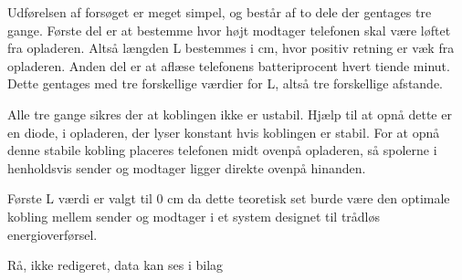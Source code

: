 Udførelsen af forsøget er meget simpel, og består af to dele der gentages tre gange. Første del er at bestemme hvor højt modtager telefonen skal være løftet fra opladeren. Altså længden L bestemmes i cm, hvor positiv retning er væk fra opladeren. Anden del er at aflæse telefonens batteriprocent hvert tiende minut. Dette gentages med tre forskellige værdier for L, altså tre forskellige afstande.

Alle tre gange sikres der at koblingen ikke er ustabil. Hjælp til at opnå dette er en diode, i opladeren, der lyser konstant hvis koblingen er stabil. For at opnå denne stabile kobling placeres telefonen midt ovenpå opladeren, så spolerne i henholdsvis sender og modtager ligger direkte ovenpå hinanden.

Første L værdi er valgt til 0 cm da dette teoretisk set burde være den optimale kobling mellem sender og modtager i et system designet til trådløs energioverførsel. 

Rå, ikke redigeret, data kan ses i bilag
